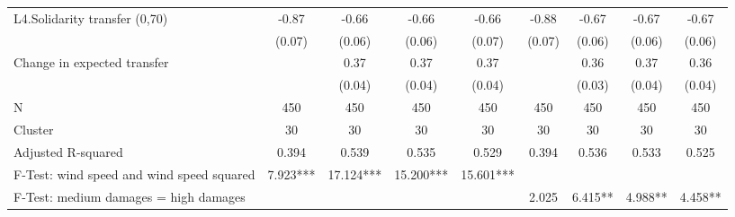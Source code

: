 {\begin{tabular}{l*{8}{c}}
L4.Solidarity transfer (0,70)&       -0.87\sym{***}&       -0.66\sym{***}&       -0.66\sym{***}&       -0.66\sym{***}&       -0.88\sym{***}&       -0.67\sym{***}&       -0.67\sym{***}&       -0.67\sym{***}\\
                    &      (0.07)         &      (0.06)         &      (0.06)         &      (0.07)         &      (0.07)         &      (0.06)         &      (0.06)         &      (0.06)         \\
Change in expected transfer&                     &        0.37\sym{***}&        0.37\sym{***}&        0.37\sym{***}&                     &        0.36\sym{***}&        0.37\sym{***}&        0.36\sym{***}\\
                    &                     &      (0.04)         &      (0.04)         &      (0.04)         &                     &      (0.03)         &      (0.04)         &      (0.04)         \\
\midrule
N                   &         450         &         450         &         450         &         450         &         450         &         450         &         450         &         450         \\
Cluster             &          30         &          30         &          30         &          30         &          30         &          30         &          30         &          30         \\
Adjusted R-squared  &       0.394         &       0.539         &       0.535         &       0.529         &       0.394         &       0.536         &       0.533         &       0.525         \\
F-Test: wind speed and wind speed squared&    7.923***         &   17.124***         &   15.200***         &   15.601***         &                     &                     &                     &                     \\
F-Test: medium damages = high damages&                     &                     &                     &                     &       2.025         &     6.415**         &     4.988**         &     4.458**         \\
\bottomrule
\end{tabular}
}
